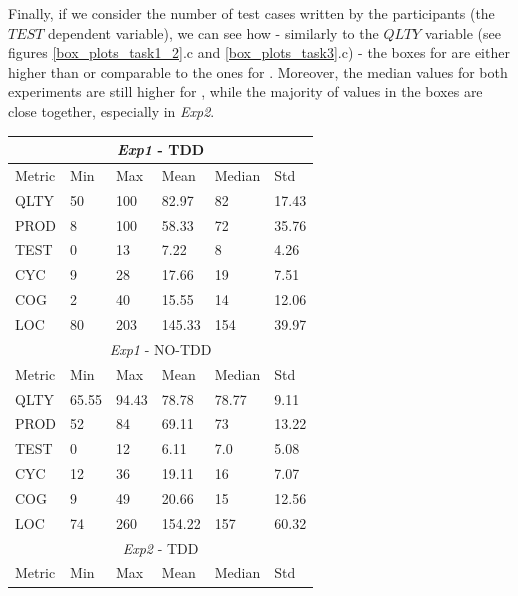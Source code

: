 Finally, if we consider the number of test cases written by the participants (\ie the $TEST$ dependent variable), we can see how - similarly to the $QLTY$ variable  (see figures \ref{box_plots_task1_2}.c and \ref{box_plots_task3}.c) - the boxes for \tdd are either higher than or comparable to the ones for \notdd. Moreover, the median values for both experiments are still higher for \tdd, while the majority of values in the boxes are close together, especially in \textit{Exp2}.

\begin{table}[H]
    \begin{center} 
        \begin{tabular}{ |p{2cm}||p{1.6cm}|p{1.6cm}|p{1.6cm}|p{1.6cm}|p{1.6cm}|}
            \hline
                \multicolumn{6}{|c|}{\textit{Exp1} - TDD} \\
            \hline
                Metric & Min & Max & Mean & Median & Std\\
            \hline
                QLTY & 50 & 100 & 82.97 & 82 & 17.43 \\
                PROD & 8 & 100 & 58.33 & 72 & 35.76 \\
                TEST & 0 & 13 & 7.22 & 8 & 4.26 \\
                CYC & 9 & 28 & 17.66 & 19 & 7.51 \\
                COG & 2 & 40 & 15.55 & 14 & 12.06 \\
                LOC & 80 & 203 & 145.33 & 154 & 39.97 \\
            \hline\hline
                \multicolumn{6}{|c|}{\textit{Exp1} - NO-TDD} \\
            \hline
                Metric & Min & Max & Mean & Median & Std\\
            \hline
                QLTY & 65.55 & 94.43 & 78.78 & 78.77 & 9.11 \\
                PROD & 52 & 84 & 69.11 & 73 & 13.22 \\
                TEST & 0 & 12 & 6.11 & 7.0 & 5.08 \\
                CYC & 12 & 36 & 19.11 & 16 & 7.07 \\
                COG & 9 & 49 & 20.66 & 15 & 12.56 \\
                LOC & 74 & 260 & 154.22 & 157 & 60.32 \\
            \hline
            \hline
                \multicolumn{6}{|c|}{\textit{Exp2} - TDD} \\
            \hline
                Metric & Min & Max & Mean & Median & Std\\

\end{tabular}
\end{center}
\end{table}
